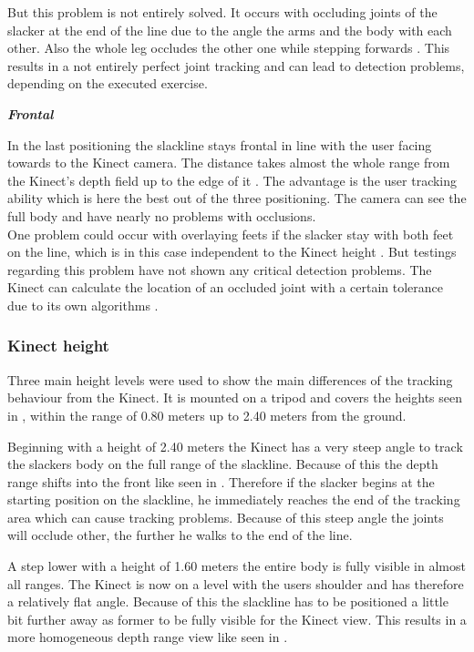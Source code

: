 But this problem is not entirely solved. It occurs with occluding joints of the slacker at the end of the line due to the angle the arms and the body \textbf{} with each other. Also the whole leg occludes the other one while stepping forwards \textbf{}. This results in a not entirely perfect joint tracking and can lead to detection problems, depending on the executed exercise.

\textit{\textbf{Frontal}}

In the last positioning the slackline stays frontal in line with the user facing towards to the Kinect camera. The distance takes almost the whole range from the Kinect’s depth field up to the edge of it \textbf{}. The advantage is the user tracking ability which is here the best out of the three positioning. The camera can see the full body and have nearly no problems with occlusions.\\
One problem could occur with overlaying feets if the slacker stay with both feet on the line, which is in this case independent to the Kinect height \textbf{}. But testings regarding this problem have not shown any critical detection problems. The Kinect can calculate the location of an occluded joint with a certain tolerance due to its own algorithms \textbf{\todo{[CITE]}}.

\subsubsection{Kinect height}
Three main height levels were used to show the main differences of the tracking behaviour from the Kinect. It is mounted on a tripod and covers the heights seen in \textbf{}, within the range of 0.80 meters up to 2.40 meters from the ground. 

Beginning with a height of 2.40 meters the Kinect has a very steep angle to track the slackers body on the full range of the slackline. Because of this the depth range shifts into the front like seen in \textbf{}. Therefore if the slacker begins at the starting position on the slackline, he immediately reaches the end of the tracking area which can cause tracking problems. Because of this steep angle the joints will occlude other, the further he walks to the end of the line.

A step lower with a height of 1.60 meters the entire body is fully visible in almost all ranges. The Kinect is now on a level with the users shoulder and has therefore a relatively flat angle. Because of this the slackline has to be positioned a little bit further away as former to be fully visible for the Kinect view. This results in a more homogeneous depth range view like seen in \textbf{}.

